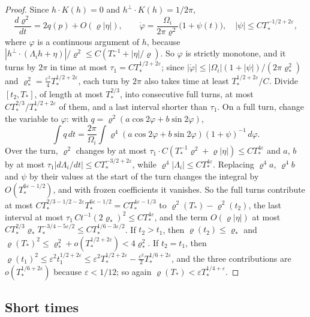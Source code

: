 \documentclass[11pt]{article}
\theoremstyle{definition}
\begin{document}
\begin{proof}
Since $h\cdot K(h) = 0$ and $h^\perp\cdot K(h) = 1/2\pi$,
\[
  \frac{d\varrho^2}{dt} = 2q(p) + O(\varrho|\eta|),\qquad \dot\varphi = \frac{\Omega_i}{2\pi\varrho^2}\bigl(1 + \psi(t)\bigr),\quad |\psi| \le CT_*^{-1/2+2\varepsilon},
\]
where $\varphi$ is a continuous argument of $h$, because $|h^\perp\cdot(\Lambda_ih + \eta)|/\varrho^2 \le C(T_*^{-1} + |\eta|/\varrho)$. So $\varphi$ is strictly monotone, and it turns by $2\pi$ in time at most $\tau_1 = CT_*^{1/2+2\varepsilon}$; since $|\dot\varphi| \le |\Omega_i|(1 + |\psi|)/(2\pi\varrho_*^2)$ and $\varrho_*^2 = \frac{\varepsilon^2}4T_*^{1/2+2\varepsilon}$, each turn by $2\pi$ also takes time at least $T_*^{1/2+2\varepsilon}/C$. Divide $[t_2, T_*]$, of length at most $T_*^{2/3}$, into consecutive full turns, at most $CT_*^{2/3}/T_*^{1/2+2\varepsilon}$ of them, and a last interval shorter than $\tau_1$. On a full turn, change the variable to $\varphi$: with $q = \varrho^2(a\cos2\varphi + b\sin2\varphi)$,
\[
  \int q\,dt = \frac{2\pi}{\Omega_i}\int\varrho^4(a\cos2\varphi + b\sin2\varphi)(1 + \psi)^{-1}\,d\varphi.
\]
Over the turn, $\varrho^2$ changes by at most $\tau_1\cdot C(T_*^{-1}\varrho^2 + \varrho|\eta|) \le CT_*^{4\varepsilon}$ and $a$, $b$ by at most $\tau_1|d\Lambda_i/dt| \le CT_*^{-3/2+2\varepsilon}$, while $\varrho^4|\Lambda_i| \le CT_*^{4\varepsilon}$. Replacing $\varrho^4a$, $\varrho^4b$ and $\psi$ by their values at the start of the turn changes the integral by $O(T_*^{6\varepsilon-1/2})$, and with frozen coefficients it vanishes. So the full turns contribute at most $CT_*^{2/3-1/2-2\varepsilon}T_*^{6\varepsilon-1/2} = CT_*^{4\varepsilon-1/3}$ to $\varrho^2(T_*) - \varrho^2(t_2)$, the last interval at most $\tau_1\,Ct^{-1}(2\varrho_*)^2 \le CT_*^{4\varepsilon}$, and the term $O(\varrho|\eta|)$ at most $CT_*^{2/3}\varrho_* T_*^{-3/4-5\varepsilon/2} \le CT_*^{1/6-3\varepsilon/2}$. If $t_2 > t_1$, then $\varrho(t_2) \le \varrho_*$ and $\varrho(T_*)^2 \le \varrho_*^2 + o(T_*^{1/2+2\varepsilon}) < 4\varrho_*^2$. If $t_2 = t_1$, then $\varrho(t_1)^2 \le \varepsilon^2t_1^{1/2+2\varepsilon} \le \varepsilon^2T_*^{1/2+2\varepsilon} - \frac{\varepsilon^2}2T_*^{1/6+2\varepsilon}$, and the three contributions are $o(T_*^{1/6+2\varepsilon})$ because $\varepsilon < 1/12$; so again $\varrho(T_*) < \varepsilon T_*^{1/4+\varepsilon}$.
\end{proof}

\subsection{Short times}
\end{document}
